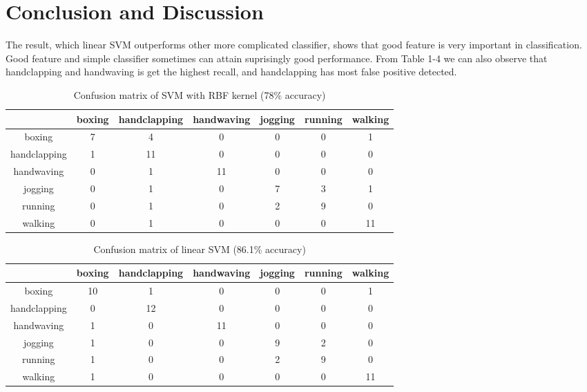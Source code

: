 \documentclass{article}
\begin{document}
\section{Conclusion and Discussion}
The result, which linear SVM outperforms other more complicated classifier, shows that good feature is very important in classification. Good feature and simple classifier sometimes can attain suprisingly good performance. From Table 1-4 we can also observe that handclapping and handwaving is get the highest recall, and handclapping has most false positive detected. 

\begin{table}[b]
\caption{Confusion matrix of SVM with RBF kernel (78\% accuracy)}
\begin{center}
\begin{tabular}{c|cccccc}\hline
&boxing&handclapping &handwaving &jogging &running &walking\\ \hline
boxing&7& 4& 0& 0& 0& 1\\
handclapping&1& 11& 0& 0& 0& 0\\
handwaving&0& 1& 11&0 &0 &0 \\
jogging&0& 1& 0&7 &3 &1 \\
running&0& 1&0 &2 &9 &0 \\
walking&0&1 &0 &0 &0 &11 \\ \hline
\end{tabular}
\end{center}
\end{table} 

\begin{table}[bh]
\caption{Confusion matrix of linear SVM (86.1\% accuracy)}
\begin{center}
\begin{tabular}{c|cccccc}\hline
&boxing&handclapping &handwaving &jogging &running &walking\\ \hline
boxing&10& 1& 0& 0& 0& 1\\
handclapping&0& 12& 0& 0& 0& 0\\
handwaving&1& 0& 11&0 &0 &0 \\
jogging&1& 0& 0&9 &2 &0 \\
running&1& 0&0 &2 &9 &0 \\
walking&1&0 &0 &0 &0 &11 \\ \hline
\end{tabular}
\end{center}
\end{table} 
\end{document}

